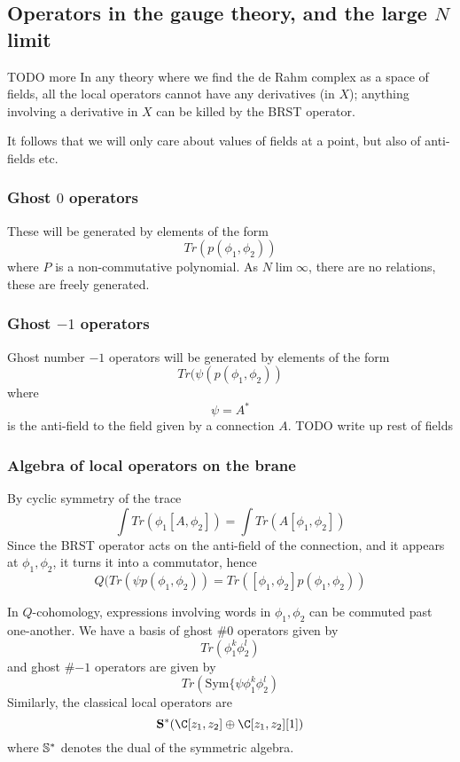 \documentclass[12pt]{amsart}
\begin{document}
\subsection{Operators in the gauge theory, and the large $N$
limit}

TODO more
In any theory where we find the de Rahm complex as a space of fields, all the
local operators cannot have any derivatives (in $X$); anything involving a
derivative in $X$ can be killed by the BRST operator.\par

It follows that we will only care about values of fields at a point, but also
of anti-fields etc.\

\subsubsection{Ghost $0$ operators}
These will be generated by elements of the form $$Tr(p(\phi_1,\phi_2))$$ where $P$ is a
non-commutative polynomial\footnotemark.
As $N \lim \infty$, there are no relations, these are freely generated.
\subsubsection{Ghost $-1$ operators}
Ghost number $-1$ operators will be generated by elements of the form
$$Tr(\psi(p(\phi_1,\phi_2))$$
  where $$\psi = A^*$$
  is the anti-field to the field given by a connection $A$.
  TODO write up rest of fields

\subsubsection{Algebra of local operators on the brane}
By cyclic symmetry of the trace $$\int Tr(\phi_1[A,\phi_2]) = \int
Tr(A[\phi_1,\phi_2])$$
Since the BRST operator acts on the anti-field of the connection, and it
appears at $\phi_1,\phi_2$, it turns it into a commutator, hence
$$Q(Tr(\psi p(\phi_1,\phi_2)) = Tr([\phi_1,\phi_2]p(\phi_1,\phi_2))$$

\begin{cor}
  In $Q$-cohomology, expressions involving words in $\phi_1,\phi_2$ can be
  commuted past one-another. We have a basis of ghost \#$0$ operators given by
  $$Tr(\phi_1^k\phi_2^l)$$
  and ghost \#$-1$ operators are given by\footnotemark $$Tr(\mathrm{Sym}\{\psi \phi_1^k
    \phi_2^l)$$
    Similarly, the classical local operators are $$\mathbf{S}^*(\C[z_1,z_2]
    \oplus \C[z_1,z_2][1])$$
    where $\mathbb{S}^*$ denotes the dual of the symmetric algebra.
\end{cor}
\end{document}

